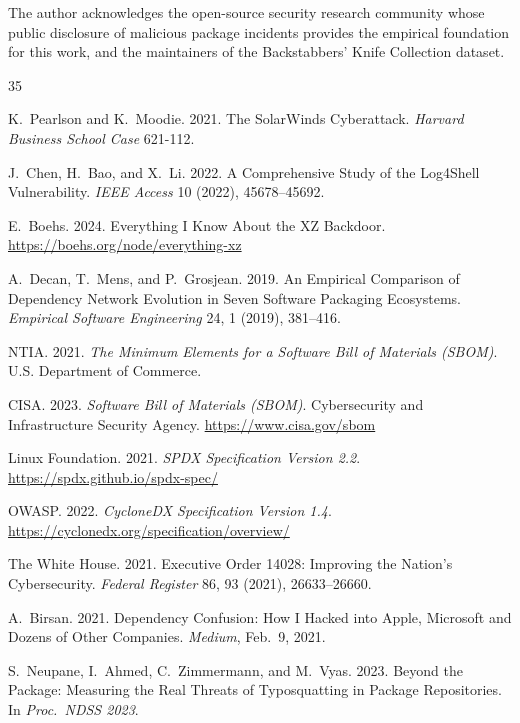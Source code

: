 \documentclass[sigconf,nonacm]{acmart}
\begin{document}
\begin{acks}
The author acknowledges the open-source security research community whose
public disclosure of malicious package incidents provides the empirical foundation
for this work, and the maintainers of the Backstabbers' Knife Collection dataset.
\end{acks}

\sloppy

\begin{thebibliography}{35}

K.~Pearlson and K.~Moodie. 2021. The SolarWinds Cyberattack.
\textit{Harvard Business School Case} 621-112.

J.~Chen, H.~Bao, and X.~Li. 2022. A Comprehensive Study of the Log4Shell
Vulnerability. \textit{IEEE Access} 10 (2022), 45678--45692.

E.~Boehs. 2024. Everything I Know About the XZ Backdoor.
\url{https://boehs.org/node/everything-xz}

A.~Decan, T.~Mens, and P.~Grosjean. 2019. An Empirical Comparison of Dependency
Network Evolution in Seven Software Packaging Ecosystems.
\textit{Empirical Software Engineering} 24, 1 (2019), 381--416.

NTIA. 2021. \textit{The Minimum Elements for a Software Bill of Materials (SBOM)}.
U.S. Department of Commerce.

CISA. 2023. \textit{Software Bill of Materials (SBOM)}. Cybersecurity and
Infrastructure Security Agency. \url{https://www.cisa.gov/sbom}

Linux Foundation. 2021. \textit{SPDX Specification Version 2.2}.
\url{https://spdx.github.io/spdx-spec/}

OWASP. 2022. \textit{CycloneDX Specification Version 1.4}.
\url{https://cyclonedx.org/specification/overview/}

The White House. 2021. Executive Order 14028: Improving the Nation's Cybersecurity.
\textit{Federal Register} 86, 93 (2021), 26633--26660.

A.~Birsan. 2021. Dependency Confusion: How I Hacked into Apple, Microsoft and
Dozens of Other Companies. \textit{Medium}, Feb.~9, 2021.

S.~Neupane, I.~Ahmed, C.~Zimmermann, and M.~Vyas. 2023. Beyond the Package:
Measuring the Real Threats of Typosquatting in Package Repositories.
In \textit{Proc.\ NDSS 2023}.


\end{thebibliography}
\end{document}

